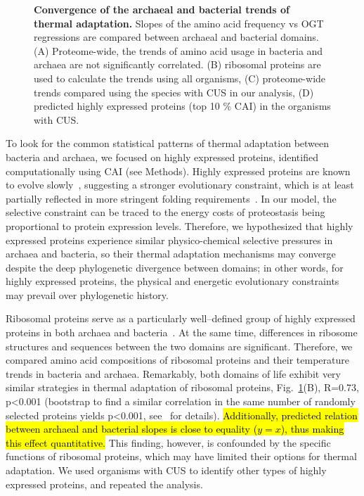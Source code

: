 \documentclass[10pt,letterpaper]{article}
\begin{document}
\begin{figure}[h!]
\caption{
{\bf Convergence of the archaeal and bacterial trends of thermal adaptation.} Slopes of the amino acid frequency vs OGT regressions are compared between archaeal and bacterial domains.
(A) Proteome-wide, the trends of amino acid usage in bacteria and archaea are not significantly correlated.
(B) ribosomal proteins are used to calculate the trends using all organisms,
(C) proteome-wide trends compared using the species with CUS in our analysis,
(D) predicted highly expressed proteins (top 10 \% CAI) in the organisms with CUS.
}
\label{fig:fig2}
\end{figure}

To look for the common statistical patterns of thermal adaptation between bacteria and archaea, we focused on highly expressed proteins, identified computationally using CAI (see Methods). Highly expressed proteins are known to evolve slowly~\cite{Pal2001Highly,Rocha2004An}, suggesting a stronger evolutionary constraint, which is at least partially reflected in more stringent folding requirements~\cite{Serohijos2012Protein,Drummond2005Why,Drummond2008MistranslationInduced}. %
In our model, the selective constraint can be traced to the energy costs of proteostasis being proportional to protein expression levels. Therefore, we hypothesized that highly expressed proteins experience similar physico-chemical selective pressures in archaea and bacteria, so their thermal adaptation mechanisms may converge despite the deep phylogenetic divergence between domains; in other words, for highly expressed proteins, the physical and energetic evolutionary constraints may prevail over phylogenetic history.

Ribosomal proteins serve as a particularly well--defined group of highly expressed proteins in both archaea and bacteria~\cite{Karlin2005Predicted}. At the same time, differences in ribosome structures and sequences between the two domains are significant. Therefore, we compared amino acid compositions of ribosomal proteins and their temperature trends in bacteria and archaea. Remarkably, both domains of life exhibit very similar strategies in thermal adaptation of ribosomal proteins, Fig.~\ref{fig:fig2}(B), R=0.73, p\textless 0.001 (bootstrap to find a similar correlation in the same number of randomly selected proteins yields p\textless0.001, see~ for details). \hl{Additionally, predicted relation between archaeal and bacterial slopes is close to equality ($y=x$), thus making this effect quantitative.} This finding, however, is confounded by the specific functions of ribosomal proteins, which may have limited their options for thermal adaptation. We used organisms with CUS to identify other types of highly expressed proteins, and repeated the analysis.
\end{document}
